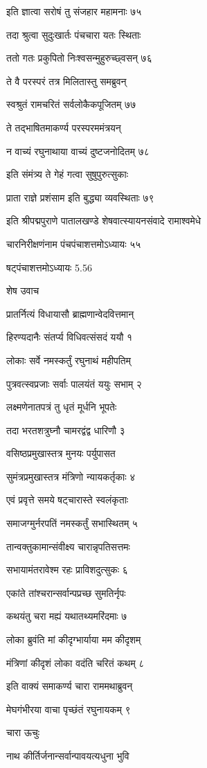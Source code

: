 इति ज्ञात्वा सरोषं तु संजहार महामनाः ७५

तदा श्रुत्वा सुदुःखार्तः पंचचारा यतः स्थिताः

ततो गतः प्रकुपितो निःश्वसन्मुहुरुच्छ्वसन् ७६

ते वै परस्परं तत्र मिलितास्तु समब्रुवन्

स्वश्रुतं रामचरितं सर्वलोकैकपूजितम् ७७

ते तद्भाषितमाकर्ण्य परस्परममंत्रयन्

न वाच्यं रघुनाथाया वाच्यं दुष्टजनोदितम् ७८

इति संमंत्र्य ते गेहं गत्वा सुषुपुरुत्सुकाः

प्राता राज्ञे प्रशंसाम इति बुद्ध्या व्यवस्थिताः ७९

इति श्रीपद्मपुराणे पातालखण्डे शेषवात्स्यायनसंवादे रामाश्वमेधे

चारनिरीक्षणंनाम पंचपंचाशत्तमोऽध्यायः ५५

षट्पंचाशत्तमोऽध्यायः 5.56

शेष उवाच

प्रातर्नित्यं विधायासौ ब्राह्मणान्वेदवित्तमान्

हिरण्यदानैः संतर्प्य विधिवत्संसदं ययौ १

लोकाः सर्वे नमस्कर्तुं रघुनाथं महीपतिम्

पुत्रवत्स्वप्रजाः सर्वाः पालयंतं ययुः सभाम् २

लक्ष्मणेनातपत्रं तु धृतं मूर्धनि भूपतेः

तदा भरतशत्रुघ्नौ चामरद्वंद्व धारिणौ ३

वसिष्ठप्रमुखास्तत्र मुनयः पर्युपासत

सुमंत्रप्रमुखास्तत्र मंत्रिणो न्यायकर्तृकाः ४

एवं प्रवृत्ते समये षट्चारास्ते स्वलंकृताः

समाजग्मुर्नरपतिं नमस्कर्तुं सभास्थितम् ५

तान्वक्तुकामान्संवीक्ष्य चारान्नृपतिसत्तमः

सभायामंतरावेश्म रहः प्राविशदुत्सुकः ६

एकांते तांश्चरान्सर्वान्पप्रच्छ सुमतिर्नृपः

कथयंतु चरा मह्यं यथातथ्यमरिंदमाः ७

लोका ब्रुवंति मां कीदृग्भार्याया मम कीदृशम्

मंत्रिणां कीदृशं लोका वदंति चरितं कथम् ८

इति वाक्यं समाकर्ण्य चारा राममथाब्रुवन्

मेघगंभीरया वाचा पृच्छंतं रघुनायकम् ९

चारा ऊचुः

नाथ कीर्तिर्जनान्सर्वान्पावयत्यधुना भुवि

